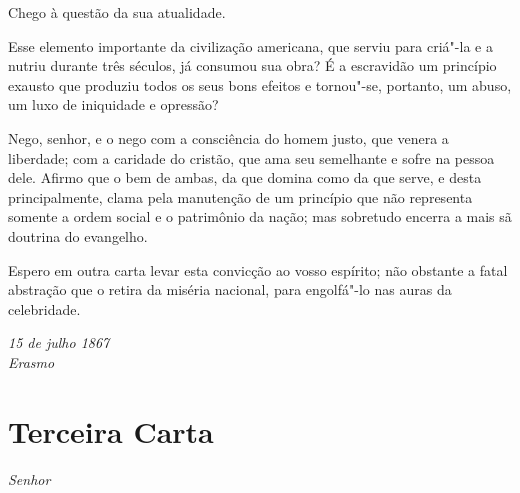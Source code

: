\begin{linenumbers}
Chego à questão da sua atualidade.

Esse elemento importante da civilização americana, que serviu para
criá"-la e a nutriu durante três séculos, já consumou sua obra? É a
escravidão um princípio exausto que produziu todos os seus bons efeitos
e tornou"-se, portanto, um abuso, um luxo de iniquidade e opressão?

Nego, senhor, e o nego com a consciência do homem justo, que venera a
liberdade; com a caridade do cristão, que ama seu semelhante e sofre na
pessoa dele. Afirmo que o bem de ambas, da que domina como da que
serve, e desta principalmente, clama pela manutenção de um princípio
que não representa somente a ordem social e o patrimônio da nação; mas
sobretudo encerra a mais sã doutrina do evangelho.

Espero em outra carta levar esta convicção ao vosso espírito; não
obstante a fatal abstração que o retira da miséria nacional, para
engolfá"-lo nas auras da celebridade.

\end{linenumbers}

\begin{flushright}
\textit{15 de julho 1867\\
Erasmo}
\end{flushright}

\chapter[Terceira Carta]{Terceira Carta }


\noindent\textit{Senhor}

\setcounter{@sectionNumCenter}{0}

\sectionitem

